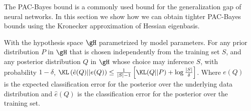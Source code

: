 \label{sec:pac}
The PAC-Bayes bound is a commonly used bound for the generalization gap of neural networks. In this section we show how we can obtain tighter PAC-Bayes bounds using the Kronecker approximation of Hessian eigenbasis.
\begin{theorem}
\citep{mcallester1999some,langford2001bounds}
With the hypothesis space $\gH$ parametrized by model parameters.
For any prior distribution $P$ in $\gH$ that is chosen independently from the training set $S$, and any posterior distribution $Q$ in $\gH$ whose choice may inference $S$, with probability $1-\delta$, $\KL\left(\hat{e}(Q)||e(Q)\right)\leq \frac{1}{|S|-1}\left[\KL(Q||P) + \log\frac{|S|}{\delta}\right]$. Where $e(Q)$ is the expected classification error for the posterior over the underlying data distribution and $\hat{e}(Q)$ is the classification error for the posterior over the training set.
\end{theorem}


